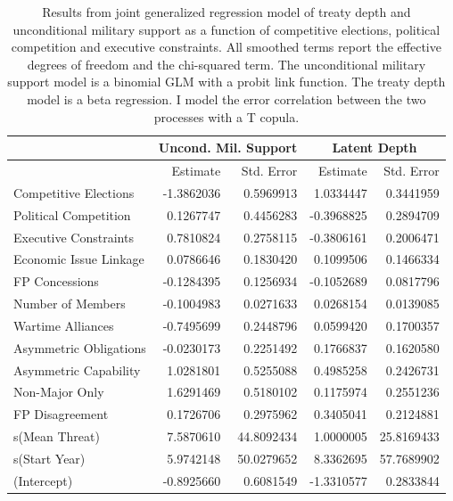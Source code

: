 \documentclass[12pt]{article}
\begin{document}
\begin{table}[ht]
\centering
\begin{tabular}{lrrrr}
 & \multicolumn{2}{c}{Uncond. Mil. Support} & \multicolumn{2}{c}{Latent Depth}\\ \hline
   & Estimate & Std. Error & Estimate & Std. Error \\ 
  \hline 
  Competitive Elections & -1.3862036 & 0.5969913 & 1.0334447 & 0.3441959 \\ 
  Political Competition & 0.1267747 & 0.4456283 & -0.3968825 & 0.2894709 \\ 
  Executive Constraints & 0.7810824 & 0.2758115 & -0.3806161 & 0.2006471 \\ 
  Economic Issue Linkage & 0.0786646 & 0.1830420 & 0.1099506 & 0.1466334 \\ 
  FP Concessions & -0.1284395 & 0.1256934 & -0.1052689 & 0.0817796 \\ 
  Number of Members & -0.1004983 & 0.0271633 & 0.0268154 & 0.0139085 \\ 
  Wartime Alliances & -0.7495699 & 0.2448796 & 0.0599420 & 0.1700357 \\ 
  Asymmetric Obligations & -0.0230173 & 0.2251492 & 0.1766837 & 0.1620580 \\ 
  Asymmetric Capability & 1.0281801 & 0.5255088 & 0.4985258 & 0.2426731 \\ 
  Non-Major Only & 1.6291469 & 0.5180102 & 0.1175974 & 0.2551236 \\ 
  FP Disagreement & 0.1726706 & 0.2975962 & 0.3405041 & 0.2124881 \\ 
  s(Mean Threat) & 7.5870610 & 44.8092434 & 1.0000005 & 25.8169433 \\ 
  s(Start Year) & 5.9742148 & 50.0279652 & 8.3362695 & 57.7689902 \\ 
  (Intercept) & -0.8925660 & 0.6081549 & -1.3310577 & 0.2833844 \\
   \hline
\end{tabular}
\caption{Results from joint generalized regression model of treaty depth and unconditional military support as a function of competitive elections, political competition and executive constraints. 
                     All smoothed terms report the effective degrees of freedom and the chi-squared term. 
                     The unconditional military support model is a binomial GLM with a probit link function. 
                     The treaty depth model is a beta regression. 
                     I model the error correlation between the two processes with a T copula.} 
\label{tab:gjrm-res-split}
\end{table}
\end{document}
